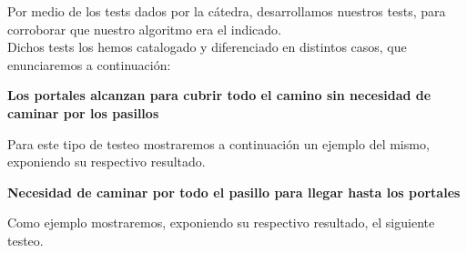 \indent Por medio de los tests dados por la c\'atedra, desarrollamos nuestros tests,
para corroborar que nuestro algoritmo era el indicado.\\

Dichos tests los hemos catalogado y diferenciado en distintos casos, que enunciaremos a continuación:

\begin{center}
 \textbf{Los portales alcanzan para cubrir todo el camino sin necesidad de caminar por los pasillos}
\end{center}
 Para este tipo de testeo mostraremos a continuaci\'on un ejemplo del mismo, exponiendo su respectivo resultado.\\

 \begin{center}
 \textbf{Necesidad de caminar por todo el pasillo para llegar hasta los portales}
\end{center}
 Como ejemplo mostraremos, exponiendo su respectivo resultado, el siguiente testeo.\\


